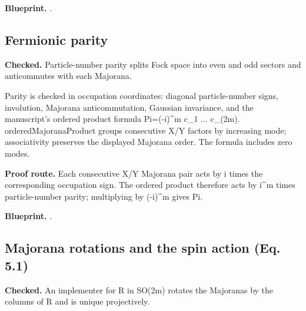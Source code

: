 \textbf{Blueprint.} .

\subsection{Fermionic parity}\label{paper:fermion-parity}
\textbf{Checked.} Particle-number parity splits Fock space into even and odd sectors and anticommutes with each Majorana. 

Parity is checked in occupation coordinates: diagonal particle-number signs, involution, Majorana anticommutation, Gaussian invariance, and the manuscript's ordered product formula Pi=(-i)\textasciicircum{}m c\_1 ... c\_(2m). orderedMajoranaProduct groups consecutive X/Y factors by increasing mode; associativity preserves the displayed Majorana order. The formula includes zero modes.

\textbf{Proof route.} Each consecutive X/Y Majorana pair acts by i times the corresponding occupation sign. The ordered product therefore acts by i\textasciicircum{}m times particle-number parity; multiplying by (-i)\textasciicircum{}m gives Pi.


\textbf{Blueprint.} .

\subsection{Majorana rotations and the spin action (Eq. 5.1)}\label{paper:fermion-action}
\textbf{Checked.} An implementer for R in SO(2m) rotates the Majoranas by the columns of R and is unique projectively. 

